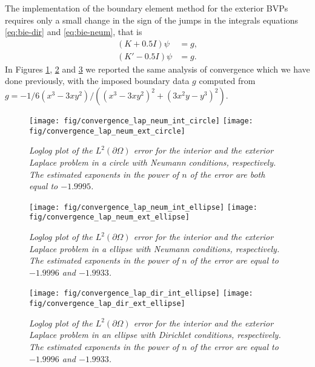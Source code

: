 \documentclass[10pt, a4paper]{article} %
\numberwithin{equation}{section}
\theoremstyle{definition}
\theoremstyle{plain}
\theoremstyle{plain}
\theoremstyle{plain}
\theoremstyle{plain}
\theoremstyle{plain}
\theoremstyle{plain}
\theoremstyle{plain}
\theoremstyle{plain}
\begin{document}
\par
The implementation of the boundary element method for the exterior BVPs
requires only 
a small change in the sign of the jumps in the integrals equations 
\eqref{eq:bie-dir} and \eqref{eq:bie-neum}, 
that is
\begin{align}
 (K + 0.5 I)\psi &= g,\label{eq:bie-dir-ext}\\
 (K' - 0.5 I)\psi &= g.\label{eq:bie-neum-ext}
\end{align}
In Figures \ref{fig:convergence_lap_neum_circle}, \ref{fig:convergence_lap_neum_ellipse} and \ref{fig:convergence_lap_dir_ellipse} we reported the same analysis of convergence which we have done 
previously, with the
imposed boundary data $g$ computed from $  g= - 1/6(x^3 - 3xy^2)/(
(x^3 - 3xy^2)^2 + (3x^2y - y^3)^2)$.

\begin{center}
\begin{figure}
{
\texttt{[image: fig/convergence\_lap\_neum\_int\_circle]}
}
{
\texttt{[image: fig/convergence\_lap\_neum\_ext\_circle]}
}%
\caption{\emph{Loglog plot of the $L^2(\partial\Omega)$ error for the interior and the exterior 
Laplace problem in a circle with Neumann conditions, respectively. The estimated exponents in the power of $n$ of the error 
are both equal to $-1.9995$.}}
\label{fig:convergence_lap_neum_circle}
\end{figure}
\end{center}

\begin{center}
\begin{figure}
{
\texttt{[image: fig/convergence\_lap\_neum\_int\_ellipse]}
}
{
\texttt{[image: fig/convergence\_lap\_neum\_ext\_ellipse]}
}%
\caption{\emph{Loglog plot of the $L^2(\partial\Omega)$ error for the interior and the exterior 
Laplace problem in a ellipse with Neumann conditions, respectively. The estimated exponents in the power of $n$ of the error 
are equal to $-1.9996$ and $-1.9933$.}}
\label{fig:convergence_lap_neum_ellipse}
\end{figure}
\end{center}


\begin{center}
\begin{figure}
{
\texttt{[image: fig/convergence\_lap\_dir\_int\_ellipse]}
}
{
\texttt{[image: fig/convergence\_lap\_dir\_ext\_ellipse]}
}%
\caption{\emph{Loglog plot of the $L^2(\partial\Omega)$ error for the interior and the exterior 
Laplace problem in an ellipse with Dirichlet conditions, respectively. The estimated exponents in the power of $n$ of the error 
are equal to $-1.9996$ and $-1.9933$.}}
\label{fig:convergence_lap_dir_ellipse}
\end{figure}
\end{center}
\end{document}
